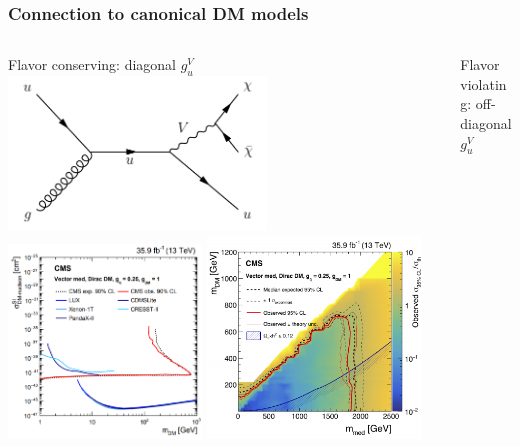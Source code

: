 \documentclass[aspectratio=169,xcolor=dvipsnames,,table,compress]{beamer}
\begin{document}
\begin{frame}[t] \frametitle{Connection to canonical DM models}
  \vspace{-5mm}
  \begin{columns}[T]
	\begin{column}{0.5\textwidth}
      \centering 
        Flavor conserving: diagonal $g_u^V$ \\ 
        \includegraphics[width=0.6\textwidth]{../figures/monotop/diagrams/mj.pdf} \\ 
        \includegraphics[width=0.45\textwidth]{../figures/talk/monojet.png}
        \includegraphics[width=0.5\textwidth]{../figures/talk/monojet2.png}
    \end{column}
	\begin{column}{0.5\textwidth}
      \centering 
        Flavor violating: off-diagonal $g_u^V$ \\ 

\end{column}
\end{columns}
\end{frame}
\end{document}
